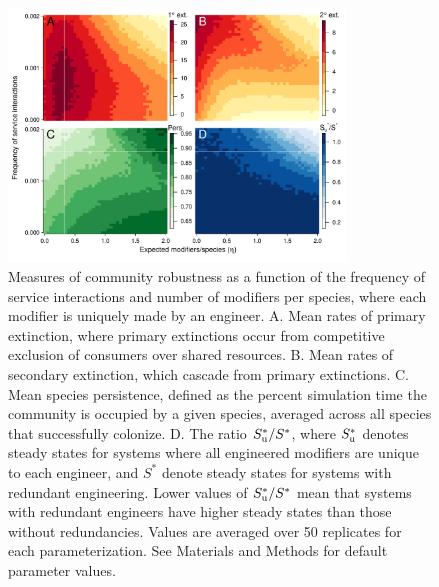 \documentclass[twocolumn,preprintnumbers,amsmath,amssymb,superscriptaddress]{revtex4}
\begin{document}
\begin{figure}[h!]
\centering
\includegraphics[width=0.8\textwidth]{fig_engineers4_unique.pdf}
\caption{
Measures of community robustness as a function of the frequency of service interactions and number of modifiers per species, where each modifier is uniquely made by an engineer.
A. Mean rates of primary extinction, where primary extinctions occur from competitive exclusion of consumers over shared resources.
B. Mean rates of secondary extinction, which cascade from primary extinctions.
C. Mean species persistence, defined as the percent simulation time the community is occupied by a given species, averaged across all species that successfully colonize.
D. The ratio $S^*_{\rm u}/S^*$, where $S^*_{\rm u}$ denotes steady states for systems where all engineered modifiers are unique to each engineer, and $S^*$ denote steady states for systems with redundant engineering. Lower values of $S^*_{\rm u}/S^*$ mean that systems with redundant engineers have higher steady states than those without redundancies.
Values are averaged over 50 replicates for each parameterization.
See Materials and Methods for default parameter values.
}
\label{fig:unique}
\end{figure}
\end{document}
